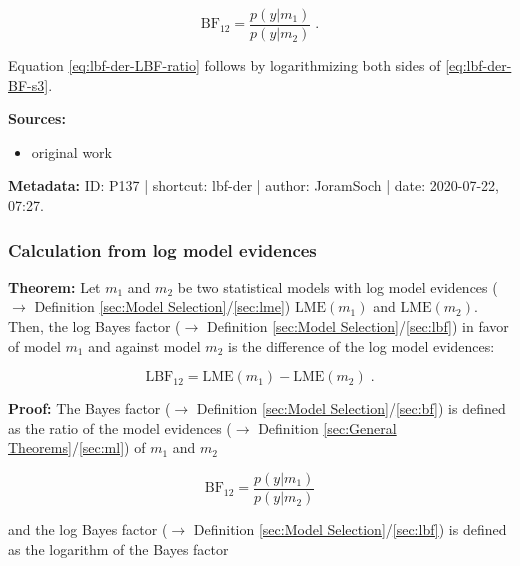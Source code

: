 \documentclass[a4paper,12pt,twoside]{book}
\begin{document}
\begin{equation} \label{eq:lbf-der-BF-s3}
\mathrm{BF}_{12} = \frac{p(y|m_1)}{p(y|m_2)} \; .
\end{equation}

Equation \eqref{eq:lbf-der-LBF-ratio} follows by logarithmizing both sides of \eqref{eq:lbf-der-BF-s3}.


\vspace{1em}
\textbf{Sources:}
\begin{itemize}
\item original work\end{itemize}


\vspace{1em}
\textbf{Metadata:} ID: P137 | shortcut: lbf-der | author: JoramSoch | date: 2020-07-22, 07:27.
\vspace{1em}



\subsubsection[\textbf{Calculation from log model evidences}]{Calculation from log model evidences} \label{sec:lbf-lme}
\setcounter{equation}{0}

\textbf{Theorem:} Let $m_1$ and $m_2$ be two statistical models with log model evidences ($\rightarrow$ Definition \ref{sec:Model Selection}/\ref{sec:lme}) $\mathrm{LME}(m_1)$ and $\mathrm{LME}(m_2)$. Then, the log Bayes factor ($\rightarrow$ Definition \ref{sec:Model Selection}/\ref{sec:lbf}) in favor of model $m_1$ and against model $m_2$ is the difference of the log model evidences:

\begin{equation} \label{eq:lbf-lme-LBF-LME}
\mathrm{LBF}_{12} = \mathrm{LME}(m_1) - \mathrm{LME}(m_2) \; .
\end{equation}


\vspace{1em}
\textbf{Proof:} The Bayes factor ($\rightarrow$ Definition \ref{sec:Model Selection}/\ref{sec:bf}) is defined as the ratio of the model evidences ($\rightarrow$ Definition \ref{sec:General Theorems}/\ref{sec:ml}) of $m_1$ and $m_2$

\begin{equation} \label{eq:lbf-lme-BF}
\mathrm{BF}_{12} = \frac{p(y|m_1)}{p(y|m_2)}
\end{equation}

and the log Bayes factor ($\rightarrow$ Definition \ref{sec:Model Selection}/\ref{sec:lbf}) is defined as the logarithm of the Bayes factor
\end{document}
